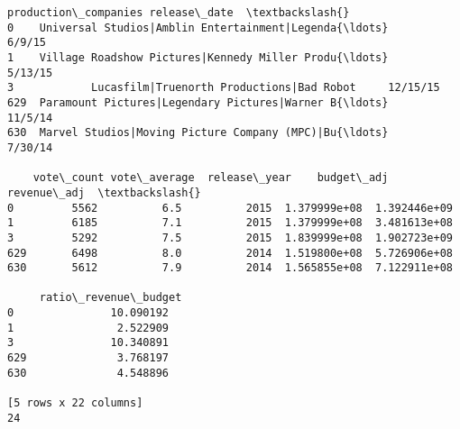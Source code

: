 \documentclass[11pt]{article}
\begin{document}
\begin{Verbatim}[commandchars=\\\{\}]
                                  production\_companies release\_date  \textbackslash{}
0    Universal Studios|Amblin Entertainment|Legenda{\ldots}       6/9/15   
1    Village Roadshow Pictures|Kennedy Miller Produ{\ldots}      5/13/15   
3            Lucasfilm|Truenorth Productions|Bad Robot     12/15/15   
629  Paramount Pictures|Legendary Pictures|Warner B{\ldots}      11/5/14   
630  Marvel Studios|Moving Picture Company (MPC)|Bu{\ldots}      7/30/14   

    vote\_count vote\_average  release\_year    budget\_adj   revenue\_adj  \textbackslash{}
0         5562          6.5          2015  1.379999e+08  1.392446e+09   
1         6185          7.1          2015  1.379999e+08  3.481613e+08   
3         5292          7.5          2015  1.839999e+08  1.902723e+09   
629       6498          8.0          2014  1.519800e+08  5.726906e+08   
630       5612          7.9          2014  1.565855e+08  7.122911e+08   

     ratio\_revenue\_budget  
0               10.090192  
1                2.522909  
3               10.340891  
629              3.768197  
630              4.548896  

[5 rows x 22 columns]
24

    \end{Verbatim}
\end{document}
